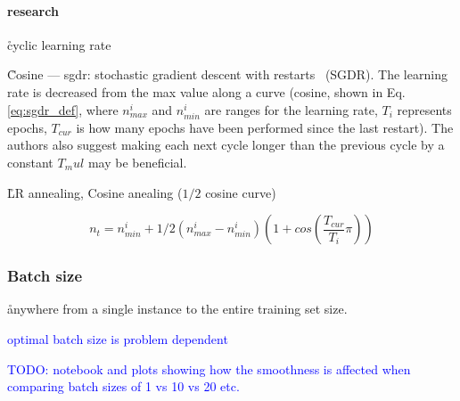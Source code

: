 \paragraph{research}


\r{cyclic learning rate~\cite{smith2017cyclical}}

\r{Cosine --- sgdr: stochastic gradient descent with restarts~\cite{loshchilov2016sgdr} (SGDR). The learning rate is decreased from the max value along a curve (cosine, shown in Eq.\ref{eq:sgdr_def}, where $n_{max}^i$ and $n_{min}^i$ are ranges for the learning rate, $T_i$ represents epochs, $T_{cur}$ is how many epochs have been performed since the last restart). The authors also suggest making each next cycle longer than the previous cycle by a constant $T_mul$ may be beneficial.}



\r{LR annealing, Cosine anealing ($1/2$ cosine curve)}


\begin{equation}
{n_t = n_{min}^i + 1/2(n_{max}^i - n_{min}^i)(1 + cos(\frac{T_{cur}}{T_i}\pi))}
\label{eq:sgdr_def}
\end{equation}

\subsubsection{Batch size}


\r{anywhere from a single instance to the entire training set size.}

\textcolor{blue}{optimal batch size is problem dependent}

\textcolor{blue}{TODO: notebook and plots showing how the smoothness is affected when comparing batch sizes of 1 vs 10 vs 20 etc.}



